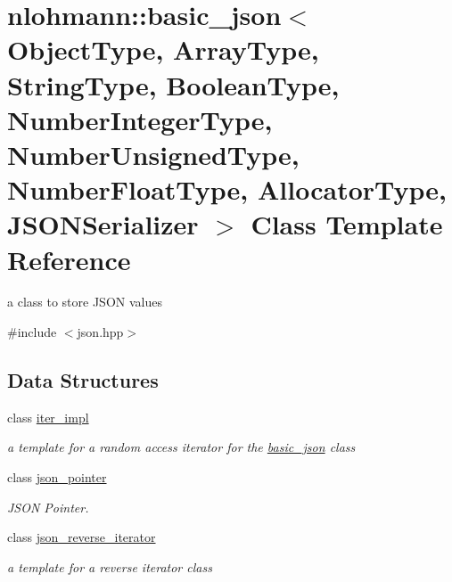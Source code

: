 \hypertarget{classnlohmann_1_1basic__json}{}\section{nlohmann\+::basic\+\_\+json$<$ Object\+Type, Array\+Type, String\+Type, Boolean\+Type, Number\+Integer\+Type, Number\+Unsigned\+Type, Number\+Float\+Type, Allocator\+Type, J\+S\+O\+N\+Serializer $>$ Class Template Reference}
\label{classnlohmann_1_1basic__json}


a class to store J\+S\+ON values  




{\ttfamily \#include $<$json.\+hpp$>$}

\subsection*{Data Structures}
\begin{DoxyCompactItemize}
\item 
class \mbox{\hyperlink{classnlohmann_1_1basic__json_1_1iter__impl}{iter\+\_\+impl}}
\begin{DoxyCompactList}\small\item\em a template for a random access iterator for the \mbox{\hyperlink{classnlohmann_1_1basic__json}{basic\+\_\+json}} class \end{DoxyCompactList}\item 
class \mbox{\hyperlink{classnlohmann_1_1basic__json_1_1json__pointer}{json\+\_\+pointer}}
\begin{DoxyCompactList}\small\item\em J\+S\+ON Pointer. \end{DoxyCompactList}\item 
class \mbox{\hyperlink{classnlohmann_1_1basic__json_1_1json__reverse__iterator}{json\+\_\+reverse\+\_\+iterator}}
\begin{DoxyCompactList}\small\item\em a template for a reverse iterator class \end{DoxyCompactList}\end{DoxyCompactItemize}
